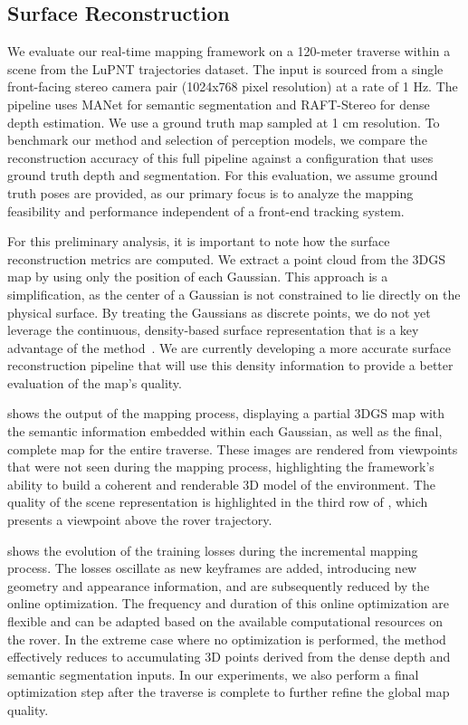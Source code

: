 \subsection{Surface Reconstruction}
We evaluate our real-time mapping framework on a 120-meter traverse within a scene from the LuPNT trajectories dataset. The input is sourced from a single front-facing stereo camera pair (1024x768 pixel resolution) at a rate of 1 Hz. The pipeline uses MANet for semantic segmentation and RAFT-Stereo for dense depth estimation.
We use a ground truth map sampled at 1 cm resolution.
To benchmark our method and selection of perception models, we compare the reconstruction accuracy of this full pipeline against a configuration that uses ground truth depth and segmentation. For this evaluation, we assume ground truth poses are provided, as our primary focus is to analyze the mapping feasibility and performance independent of a front-end tracking system.

For this preliminary analysis, it is important to note how the surface reconstruction metrics are computed. We extract a point cloud from the 3DGS map by using only the position of each Gaussian. This approach is a simplification, as the center of a Gaussian is not constrained to lie directly on the physical surface. By treating the Gaussians as discrete points, we do not yet leverage the continuous, density-based surface representation that is a key advantage of the method~\cite{wolf_gs2mesh_2025}. We are currently developing a more accurate surface reconstruction pipeline that will use this density information to provide a better evaluation of the map's quality.

 shows the output of the mapping process, displaying a partial 3DGS map with the semantic information embedded within each Gaussian, as well as the final, complete map for the entire traverse.
These images are rendered from viewpoints that were not seen during the mapping process, highlighting the framework's ability to build a coherent and renderable 3D model of the environment.
The quality of the scene representation is highlighted in the third row of , which presents a viewpoint above the rover trajectory.

 shows the evolution of the training losses during the incremental mapping process. The losses oscillate as new keyframes are added, introducing new geometry and appearance information, and are subsequently reduced by the online optimization. The frequency and duration of this online optimization are flexible and can be adapted based on the available computational resources on the rover. In the extreme case where no optimization is performed, the method effectively reduces to accumulating 3D points derived from the dense depth and semantic segmentation inputs. In our experiments, we also perform a final optimization step after the traverse is complete to further refine the global map quality.

